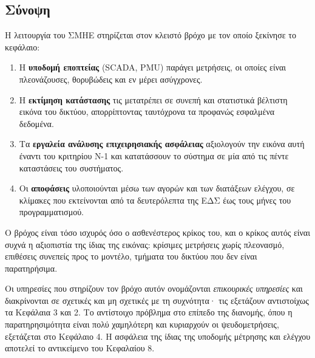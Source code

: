 \subsection{Σύνοψη}

Η λειτουργία του ΣΜΗΕ στηρίζεται στον κλειστό βρόχο με τον οποίο ξεκίνησε το κεφάλαιο:

\begin{enumerate}
\item Η \textbf{υποδομή εποπτείας} (SCADA, PMU) παράγει μετρήσεις, οι οποίες είναι
      πλεονάζουσες, θορυβώδεις και εν μέρει ασύγχρονες.
\item Η \textbf{εκτίμηση κατάστασης} τις μετατρέπει σε συνεπή και στατιστικά βέλτιστη
      εικόνα του δικτύου, απορρίπτοντας ταυτόχρονα τα προφανώς εσφαλμένα δεδομένα.
\item Τα \textbf{εργαλεία ανάλυσης επιχειρησιακής ασφάλειας} αξιολογούν την εικόνα αυτή
      έναντι του κριτηρίου N-1 και κατατάσσουν το σύστημα σε μία από τις πέντε καταστάσεις
      του συστήματος.
\item Οι \textbf{αποφάσεις} υλοποιούνται μέσω των αγορών και των διατάξεων ελέγχου, σε
      κλίμακες που εκτείνονται από τα δευτερόλεπτα της ΕΔΣ έως τους μήνες
      του προγραμματισμού.
\end{enumerate}

Ο βρόχος είναι τόσο ισχυρός όσο ο ασθενέστερος κρίκος του, και ο κρίκος αυτός είναι συχνά
η αξιοπιστία της ίδιας της εικόνας: κρίσιμες μετρήσεις χωρίς πλεονασμό, επιθέσεις συνεπείς
προς το μοντέλο, τμήματα του δικτύου που δεν είναι παρατηρήσιμα.

Οι υπηρεσίες που στηρίζουν τον βρόχο αυτόν ονομάζονται \emph{επικουρικές υπηρεσίες} και
διακρίνονται σε σχετικές και μη σχετικές με τη συχνότητα· τις εξετάζουν αντιστοίχως τα
Κεφάλαια 3 και 2. Το αντίστοιχο πρόβλημα στο επίπεδο της διανομής, όπου η παρατηρησιμότητα
είναι πολύ χαμηλότερη και κυριαρχούν οι ψευδομετρήσεις, εξετάζεται στο Κεφάλαιο 4. Η
ασφάλεια της ίδιας της υποδομής μέτρησης και ελέγχου αποτελεί το αντικείμενο του
Κεφαλαίου 8.
